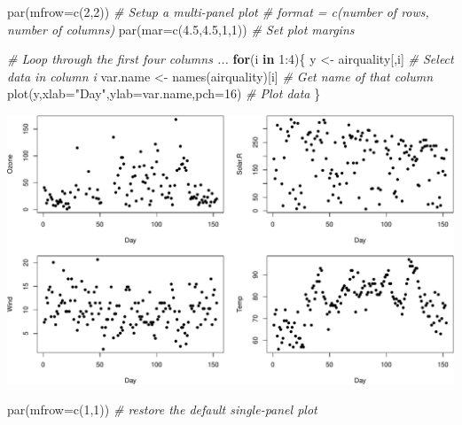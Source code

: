 \documentclass[
]{book}
\newenvironment{Shaded}{\begin{snugshade}}{\end{snugshade}}
\newcommand{\AttributeTok}[1]{\textcolor[rgb]{0.77,0.63,0.00}{#1}}
\newcommand{\CommentTok}[1]{\textcolor[rgb]{0.56,0.35,0.01}{\textit{#1}}}
\newcommand{\ControlFlowTok}[1]{\textcolor[rgb]{0.13,0.29,0.53}{\textbf{#1}}}
\newcommand{\DecValTok}[1]{\textcolor[rgb]{0.00,0.00,0.81}{#1}}
\newcommand{\FloatTok}[1]{\textcolor[rgb]{0.00,0.00,0.81}{#1}}
\newcommand{\FunctionTok}[1]{\textcolor[rgb]{0.00,0.00,0.00}{#1}}
\newcommand{\NormalTok}[1]{#1}
\newcommand{\OtherTok}[1]{\textcolor[rgb]{0.56,0.35,0.01}{#1}}
\newcommand{\SpecialCharTok}[1]{\textcolor[rgb]{0.00,0.00,0.00}{#1}}
\newcommand{\StringTok}[1]{\textcolor[rgb]{0.31,0.60,0.02}{#1}}
\begin{document}
\begin{Shaded}
\begin{Highlighting}[]
\FunctionTok{par}\NormalTok{(}\AttributeTok{mfrow=}\FunctionTok{c}\NormalTok{(}\DecValTok{2}\NormalTok{,}\DecValTok{2}\NormalTok{)) }\CommentTok{\# Setup a multi{-}panel plot \# format = c(number of rows, number of columns)}
\FunctionTok{par}\NormalTok{(}\AttributeTok{mar=}\FunctionTok{c}\NormalTok{(}\FloatTok{4.5}\NormalTok{,}\FloatTok{4.5}\NormalTok{,}\DecValTok{1}\NormalTok{,}\DecValTok{1}\NormalTok{)) }\CommentTok{\# Set plot margins}

\CommentTok{\# Loop through the first four columns ...}
\ControlFlowTok{for}\NormalTok{(i }\ControlFlowTok{in} \DecValTok{1}\SpecialCharTok{:}\DecValTok{4}\NormalTok{)\{}
\NormalTok{  y }\OtherTok{\textless{}{-}}\NormalTok{ airquality[,i] }\CommentTok{\# Select data in column i}
\NormalTok{  var.name }\OtherTok{\textless{}{-}} \FunctionTok{names}\NormalTok{(airquality)[i] }\CommentTok{\# Get name of that column}
  \FunctionTok{plot}\NormalTok{(y,}\AttributeTok{xlab=}\StringTok{"Day"}\NormalTok{,}\AttributeTok{ylab=}\NormalTok{var.name,}\AttributeTok{pch=}\DecValTok{16}\NormalTok{) }\CommentTok{\# Plot data}
\NormalTok{\}}
\end{Highlighting}
\end{Shaded}

\includegraphics{figures/unnamed-chunk-308-1.pdf}

\begin{Shaded}
\begin{Highlighting}[]

\FunctionTok{par}\NormalTok{(}\AttributeTok{mfrow=}\FunctionTok{c}\NormalTok{(}\DecValTok{1}\NormalTok{,}\DecValTok{1}\NormalTok{)) }\CommentTok{\# restore the default single{-}panel plot}
\end{Highlighting}
\end{Shaded}
\end{document}
